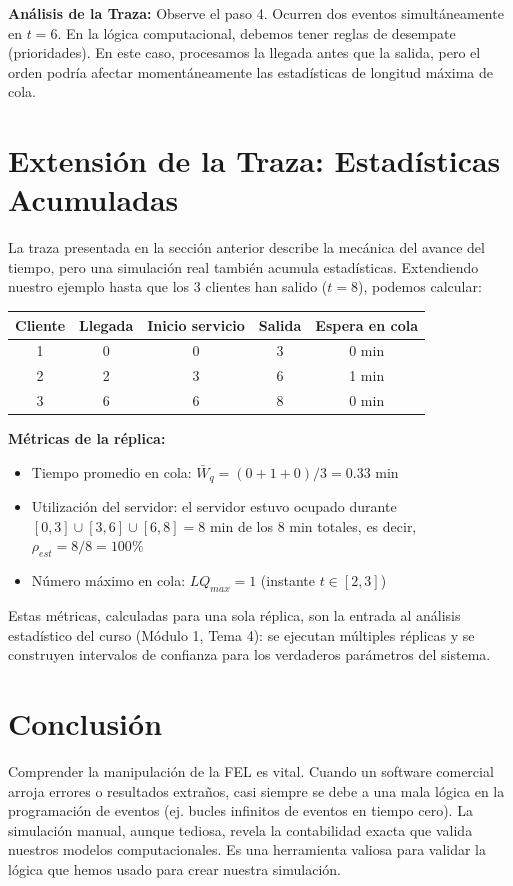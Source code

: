 \documentclass[11pt, letterpaper]{article}
\begin{document}
\textbf{Análisis de la Traza:}
Observe el paso 4. Ocurren dos eventos simultáneamente en $t=6$. En la lógica computacional, debemos tener reglas de desempate (prioridades). En este caso, procesamos la llegada antes que la salida, pero el orden podría afectar momentáneamente las estadísticas de longitud máxima de cola.

\section{Extensión de la Traza: Estadísticas Acumuladas}

La traza presentada en la sección anterior describe la mecánica del avance del tiempo, pero una simulación real también acumula estadísticas. Extendiendo nuestro ejemplo hasta que los 3 clientes han salido ($t = 8$), podemos calcular:

\begin{center}
\small
\begin{tabular}{ccccc}
\toprule
\textbf{Cliente} & \textbf{Llegada} & \textbf{Inicio servicio} & \textbf{Salida} & \textbf{Espera en cola} \\
\midrule
1 & 0 & 0 & 3 & 0 min \\
2 & 2 & 3 & 6 & 1 min \\
3 & 6 & 6 & 8 & 0 min \\
\bottomrule
\end{tabular}
\end{center}

\textbf{Métricas de la réplica:}
\begin{itemize}
    \item Tiempo promedio en cola: $\bar{W}_q = (0 + 1 + 0)/3 = 0.33$ min
    \item Utilización del servidor: el servidor estuvo ocupado durante $[0,3] \cup [3,6] \cup [6,8] = 8$ min de los 8 min totales, es decir, $\rho_{est} = 8/8 = 100\%$
    \item Número máximo en cola: $LQ_{max} = 1$ (instante $t \in [2,3]$)
\end{itemize}

Estas métricas, calculadas para una sola réplica, son la entrada al análisis estadístico del curso (Módulo 1, Tema 4): se ejecutan múltiples réplicas y se construyen intervalos de confianza para los verdaderos parámetros del sistema.

\section{Conclusión}
Comprender la manipulación de la FEL es vital. Cuando un software comercial arroja errores o resultados extraños, casi siempre se debe a una mala lógica en la programación de eventos (ej. bucles infinitos de eventos en tiempo cero). La simulación manual, aunque tediosa, revela la contabilidad exacta que valida nuestros modelos computacionales. Es una herramienta valiosa para validar la lógica que hemos usado para crear nuestra simulación.
\end{document}
